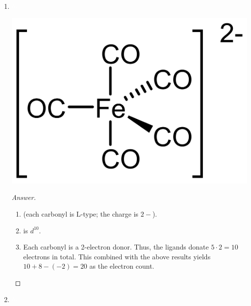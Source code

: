 \documentclass[../psets.tex]{subfiles}
\begin{document}
\begin{enumerate}
\begin{enumerate}[label={\arabic*)}]
\begin{proof}[Answer]
\begin{enumerate}[label={(\roman*)}]
                \item {} (each carbonyl is L-type; the hydride is X-type; the propene is L-type).
                \item {} is $d^8$.
                \item Each carbonyl is a 2-electron donor, the hydrogen is a 1-electron donor, and propene is a 2-electron donor. Thus, the ligands donate $3\cdot 2+1\cdot 1+1\cdot 2=9$ electrons in total. This combined with the above result yields $9+9=18$ as the electron count.
            \end{enumerate}
        \end{proof}
        \item ${\color{white}hi}$
        \begin{center}
            \includegraphics[width=0.25\linewidth]{../ExtFiles/pset1-1-03.png}
        \end{center}
        \begin{proof}[Answer]\leavevmode
            \begin{enumerate}[label={(\roman*)}]
                \item {} (each carbonyl is L-type; the charge is $2-$).
                \item {} is $d^{10}$.
                \item Each carbonyl is a 2-electron donor. Thus, the ligands donate $5\cdot 2=10$ electrons in total. This combined with the above results yields $10+8-(-2)=20$ as the electron count.
            \end{enumerate}
        \end{proof}
        \newpage
        \item ${\color{white}hi}$
        \vspace{-1em}
        \begin{center}

\end{center}
\end{enumerate}
\end{enumerate}
\end{document}
